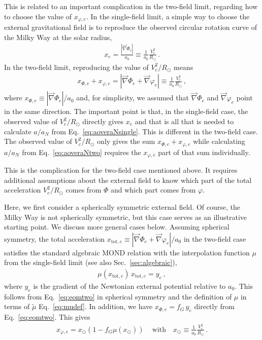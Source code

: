\documentclass[reprint, amsmath,amssymb, nofootinbib, aps, prd]{revtex4-2}
\begin{document}
This is related to an important complication in the two-field limit, regarding how to choose the value of $x_{\varphi,e}$.
In the single-field limit, a simple way to choose the external gravitational field is to reproduce the observed circular rotation curve of the Milky Way at the solar radius,
\begin{align}
 x_e = \frac{|\vec{\nabla} \Phi_e|}{a_0} \equiv \frac{1}{a_0} \frac{V_c^2}{R_\odot} \,.
\end{align}
In the two-field limit, reproducing the value of $V_c^2/R_\odot$ means
\begin{align}
 x_{\Phi,e} + x_{\varphi,e} = |\vec{\nabla} \Phi_e + \vec{\nabla} \varphi_e| \equiv \frac{1}{a_0} \frac{V_c^2}{R_\odot} \,,
\end{align}
where $x_{\Phi, e} \equiv |\vec{\nabla} \Phi_e|/a_0$ and, for simplicity, we assumed that $\vec{\nabla} \Phi_e$ and $\vec{\nabla} \varphi_e$ point in the same direction.
The important point is that, in the single-field case, the observed value of $V_c^2/R_\odot$ directly gives $x_e$ and that is all that is needed to calculate $a/a_N$ from Eq.~\eqref{eq:aoveraNsingle}.
This is different in the two-field case.
The observed value of $V_c^2/R_\odot$ only gives the sum $x_{\Phi,e} + x_{\varphi,e}$ while calculating $a/a_N$ from Eq.~\eqref{eq:aoveraNtwo} requires the $x_{\varphi,e}$ part of that sum individually.

This is the complication for the two-field case mentioned above.
It requires additional assumptions about the external field to know which part of the total acceleration $V_c^2/R_\odot$ comes from $\Phi$ and which part comes from $\varphi$.

Here, we first consider a spherically symmetric external field.
Of course, the Milky Way is not spherically symmetric,  but this case serves as an illustrative starting point.
We discuss more general cases below.
Assuming spherical symmetry, the total acceleration $x_{\mathrm{tot},e} \equiv |\vec{\nabla} \Phi_e + \vec{\nabla} \varphi_e|/a_0$ in the two-field case satisfies the standard algebraic MOND relation with the interpolation function $\mu$ from the single-field limit (see also Sec.~\ref{sec:algebraic}),
\begin{align}
\label{eq:xtotalgebraic}
\mu(x_{\mathrm{tot},e}) \, x_{\mathrm{tot},e} = y_e \,,
\end{align}
where $y_e$ is the gradient of the Newtonian external potential relative to $a_0$.
This follows from Eq.~\eqref{eq:eomtwo} in spherical symmetry and the definition of $\mu$ in terms of $\tilde{\mu}$ Eq.~\eqref{eq:mudef}.
In addition, we have $x_{\Phi,e} = f_G \, y_e$ directly from Eq.~\eqref{eq:eomtwo}.
This gives
\begin{align}
 \label{eq:xvarphie:spherical}
 x_{\varphi,e} = x_\odot ( 1 - f_G \mu(x_\odot)) \, \quad \mathrm{with} \quad x_\odot \equiv \frac{1}{a_0} \frac{V_c^2}{R_\odot} \,.
\end{align}
\end{document}
